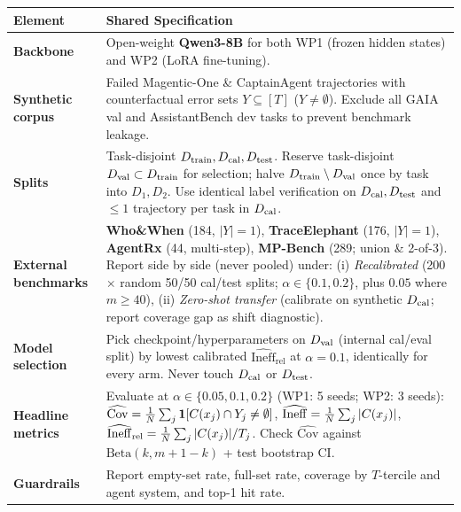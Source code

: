 \smallskip
{\small\renewcommand{\arraystretch}{1.06}%
\noindent\begin{tabularx}{\linewidth}{@{}>{\raggedright\arraybackslash}p{2.8cm} L@{}}\toprule
\sffamily\bfseries Element & \sffamily\bfseries Shared Specification \\\midrule
\textbf{Backbone} & Open-weight \textbf{Qwen3-8B} for both WP1 (frozen hidden states) and WP2 (LoRA fine-tuning). \\
\textbf{Synthetic corpus} & Failed Magentic-One \& CaptainAgent trajectories with counterfactual error sets $Y\subseteq[T]$ ($Y\neq\emptyset$). Exclude all GAIA val and AssistantBench dev tasks to prevent benchmark leakage. \\
\textbf{Splits} & Task-disjoint $D_{\mathrm{train}}, D_{\mathrm{cal}}, D_{\mathrm{test}}$. Reserve task-disjoint $D_{\mathrm{val}}\subset D_{\mathrm{train}}$ for selection; halve $D_{\mathrm{train}}\setminus D_{\mathrm{val}}$ once by task into $D_1, D_2$. Use identical label verification on $D_{\mathrm{cal}},D_{\mathrm{test}}$ and $\le 1$ trajectory per task in $D_{\mathrm{cal}}$. \\
\textbf{External benchmarks} & \textbf{Who\&When} (184, $|Y|=1$), \textbf{TraceElephant} (176, $|Y|=1$), \textbf{AgentRx} (44, multi-step), \textbf{MP-Bench} (289; union \& 2-of-3). Report side by side (never pooled) under: (i) \emph{Recalibrated} (200$\times$ random 50/50 cal/test splits; $\alpha\in\{0.1,0.2\}$, plus $0.05$ where $m\ge 40$), (ii) \emph{Zero-shot transfer} (calibrate on synthetic $D_{\mathrm{cal}}$; report coverage gap as shift diagnostic). \\
\textbf{Model selection} & Pick checkpoint/hyperparameters on $D_{\mathrm{val}}$ (internal cal/eval split) by lowest calibrated $\widehat{\mathrm{Ineff}}_{\mathrm{rel}}$ at $\alpha=0.1$, identically for every arm. Never touch $D_{\mathrm{cal}}$ or $D_{\mathrm{test}}$. \\
\textbf{Headline metrics} & Evaluate at $\alpha\in\{0.05,0.1,0.2\}$ (WP1: 5 seeds; WP2: 3 seeds):
$\widehat{\mathrm{Cov}} = \frac{1}{N}\sum_j \mathbf{1}[C(x_j)\cap Y_j\neq\emptyset]$,
$\widehat{\mathrm{Ineff}} = \frac{1}{N}\sum_j |C(x_j)|$,
$\widehat{\mathrm{Ineff}}_{\mathrm{rel}} = \frac{1}{N}\sum_j |C(x_j)|/T_j$.
Check $\widehat{\mathrm{Cov}}$ against $\mathrm{Beta}(k,m+1-k)$ + test bootstrap CI. \\
\textbf{Guardrails} & Report empty-set rate, full-set rate, coverage by $T$-tercile and agent system, and top-1 hit rate. \\\bottomrule
\end{tabularx}}
\smallskip
